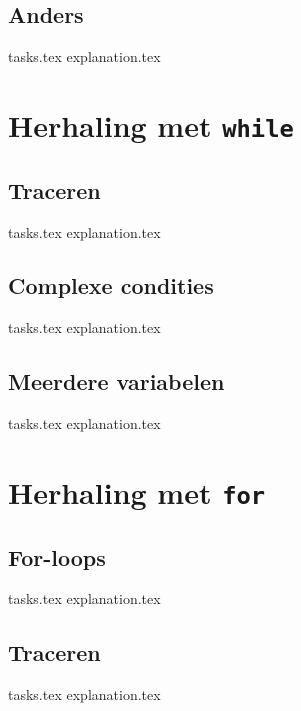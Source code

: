     \section{Anders}
    {tasks.tex}              \newpage
    {explanation.tex}           \newpage

    \chapter{Herhaling met \texttt{while}}
    \newpage

    \section{Traceren}
    {tasks.tex}           \newpage
    {explanation.tex}        \newpage

    \section{Complexe condities}
    {tasks.tex} \newpage
    {explanation.tex} \newpage

    \section{Meerdere variabelen}
    {tasks.tex}     \newpage
    {explanation.tex}  \newpage

    \chapter{Herhaling met \texttt{for}}
    \newpage

    \section{For-loops}
    {tasks.tex}         \newpage
    {explanation.tex}      \newpage

    \section{Traceren}
    {tasks.tex}               \newpage
    {explanation.tex}            \newpage

